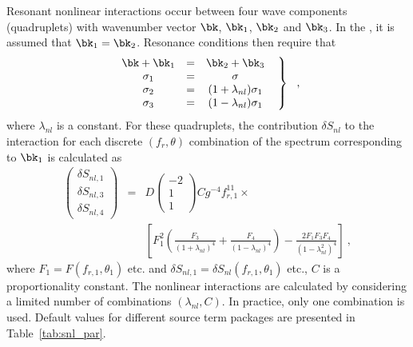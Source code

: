 Resonant nonlinear interactions occur between four wave components
(quadruplets) with wavenumber vector $\bk$, $\bk_1$, $\bk_2$ and $\bk_3$. In the \dia, it
is assumed that $\bk_1 = \bk_2$. Resonance conditions then require that
\begin{equation} \left .
\begin{array}{ccc}
  \bk + \bk_1 & = & \bk_2 + \bk_3          \\
  \sigma_1  & = & \sigma                   \\
  \sigma_2  & = & (1+\lambda_{nl})\sigma_1   \\
  \sigma_3  & = & (1-\lambda_{nl})\sigma_1
\end{array} \:\:\: \right \rbrace \:\:\: , \label{eq:resonance}
\end{equation}
where $\lambda_{nl}$ is a constant. For these quadruplets, the contribution
$\delta S_{nl}$ to the interaction for each discrete $(f_r,\theta)$
combination of the spectrum corresponding to $\bk_1$ is calculated as
\begin{eqnarray}
\left ( \begin{array}{c}
  \delta S_{nl,1} \\ \delta S_{nl,3} \\ \delta S_{nl,4}
\end{array} \right ) & = & D
\left ( \begin{array}{r} -2 \\ 1 \\ 1 \end{array} \right )
C g^{-4} f_{r,1}^{11} \times \nonumber \\
& & \left [ F_1^2
\left ( \frac{F_3}{(1+\lambda_{nl})^4} +
        \frac{F_4}{(1-\lambda_{nl})^4} \right ) -
\frac{2 F_1 F_3 F_4}{(1-\lambda_{nl}^2)^4}
\right ] \: , \label{eq:snl_dia}
\end{eqnarray}
where $F_1 = F(f_{r,1} ,\theta_1 )$ etc. and $\delta S_{nl,1} = \delta
S_{nl}(f_{r,1} ,\theta_1 )$ etc., $C$ is a proportionality constant. The
nonlinear interactions are calculated by considering a limited number of
combinations $(\lambda_{nl},C)$. In practice, only one combination is
used. Default values for different source term packages are presented in
Table~\ref{tab:snl_par}.



